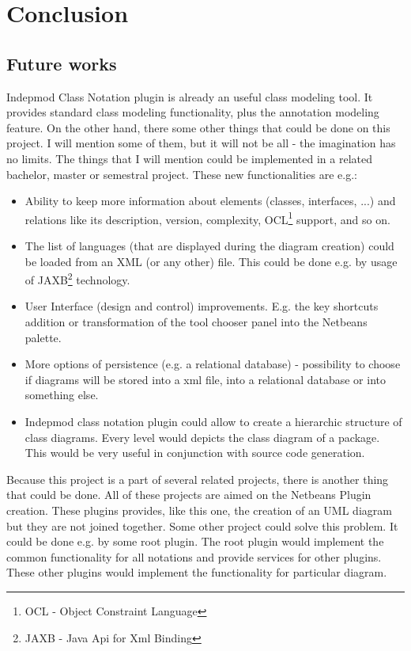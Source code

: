 \chapter{Conclusion}

\section{Future works}

Indepmod Class Notation plugin is already an useful class modeling tool. It provides standard class modeling functionality, plus the annotation modeling feature. On the other hand, there some other things that could be done on this project. I will mention some of them, but it will not be all - the imagination has no limits. The things that I will mention could be implemented in a related bachelor, master or semestral project. These new functionalities are e.g.:

\begin{itemize}
    \item Ability to keep more information about elements (classes, interfaces, ...) and relations like its description, version, complexity, OCL\footnote{OCL - Object Constraint Language} support, and so on.
    \item The list of languages (that are displayed during the diagram creation) could be loaded from an XML (or any other) file. This could be done e.g. by usage of JAXB\footnote{JAXB - Java Api for Xml Binding} technology.
    \item User Interface (design and control) improvements. E.g. the key shortcuts addition or transformation of the tool chooser panel into the Netbeans palette.
    \item More options of persistence (e.g. a relational database) - possibility to choose if diagrams will be stored into a xml file, into a relational database or into something else.
    \item Indepmod class notation plugin could allow to create a hierarchic structure of class diagrams. Every level would depicts the class diagram of a package. This would be very useful in conjunction with source code generation.
\end{itemize}

Because this project is a part of several related projects, there is another thing that could be done. All of these projects are aimed on the Netbeans Plugin creation. These plugins provides, like this one, the creation of an UML diagram but they are not joined together. Some other project could solve this problem. It could be done e.g. by some root plugin. The root plugin would implement the common functionality for all notations and provide services for other plugins. These other plugins would implement the functionality for particular diagram.

